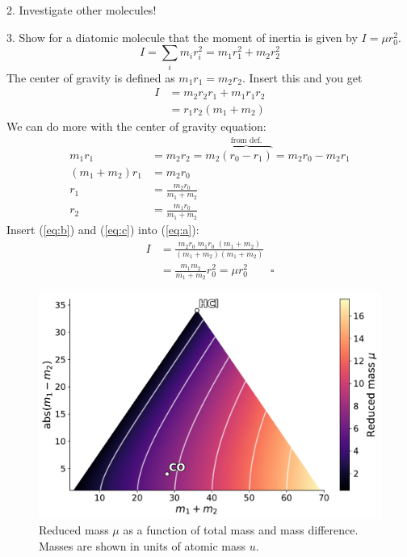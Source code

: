 \documentclass[paper=a4, fontsize=11pt]{scrartcl}
\begin{document}
2. Investigate other molecules!

3. Show for a diatomic molecule that the moment of inertia is given by $I = \mu r_0^2$.
\begin{equation*}
  I = \sum_i m_i r_i^2 = m_1 r_1^2 + m_2 r_2^2
\end{equation*}
The center of gravity is defined as $m_1 r_1 = m_2 r_2$. Insert this and you get
\begin{align}
  I &= m_2 r_2 r_1 + m_1 r_1 r_2 \nonumber\\
    &= r_1 r_2 (m_1 + m_2) \label{eq:a}
\end{align}
We can do more with the center of gravity equation:
\begin{align}
  m_1 r_1 &= m_2 r_2 = m_2 \overbrace{(r_0 - r_1)}^\text{from def.} = m_2 r_0 - m_2 r_1 \nonumber\\
  (m_1 + m_2) r_1 &= m_2 r_0 \nonumber\\
  r_1 &= \frac{m_2 r_0}{m_1 + m_2} \label{eq:b}\\
  r_2 &= \frac{m_1 r_0}{m_1 + m_2} \label{eq:c}
\end{align}
Insert (\ref{eq:b}) and (\ref{eq:c}) into (\ref{eq:a}):
\begin{align*}
  I &= \frac{m_2r_0 \; m_1r_0 \; (m_1 + m_2)}{(m_1 + m_2)(m_1 + m_2)} \\
    &= \frac{m_1m_2}{m_1 + m_2} r_0^2 = \mu r_0^2 \qquad\square
\end{align*}

\vfill
\begin{figure}[ht]
  \centering
  \includegraphics[width=\textwidth]{plots/reduced_mass.pdf}
  \caption{Reduced mass $\mu$ as a function of total mass and mass difference.
    Masses are shown in units of atomic mass $u$. \label{fig:reduced_mass}}
\end{figure}
\end{document}
